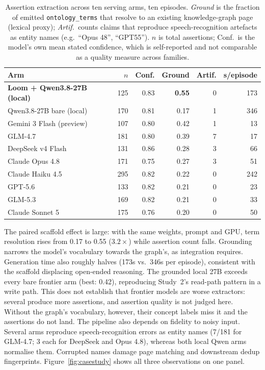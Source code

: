 \documentclass[10pt,twocolumn]{article}
\begin{document}
\begin{table}[t]\centering\small
\caption{Assertion extraction across ten serving arms, ten episodes. \emph{Ground}
is the fraction of emitted \texttt{ontology\_terms} that resolve to an existing knowledge-graph
page (lexical proxy); \emph{Artif.}\ counts claims that reproduce speech-recognition artefacts as
entity names (e.g.\ ``Opus 48'', ``GPT55''). $n$ is total assertions; Conf.\ is the model's own
mean stated confidence, which is self-reported and not comparable as a quality measure across
families.}
\label{tab:casestudy}
\renewcommand{\arraystretch}{1.15}
\begin{tabular}{@{}lrrrrr@{}}
\toprule
Arm & $n$ & Conf. & Ground & Artif. & s/episode \\
\midrule
\textbf{Loom + Qwen3.8-27B (local)} & 125 & 0.83 & \textbf{0.55} & 0 & 173 \\
Qwen3.8-27B bare (local)            & 170 & 0.81 & 0.17 & 1 & 346 \\
\midrule
Gemini 3 Flash (preview)            & 107 & 0.80 & 0.42 & 1 & 13 \\
GLM-4.7                             & 181 & 0.80 & 0.39 & 7 & 17 \\
DeepSeek v4 Flash                   & 131 & 0.86 & 0.28 & 3 & 66 \\
Claude Opus 4.8                     & 171 & 0.75 & 0.27 & 3 & 51 \\
Claude Haiku 4.5                    & 295 & 0.82 & 0.22 & 0 & 242 \\
GPT-5.6                             & 133 & 0.82 & 0.21 & 0 & 23 \\
GLM-5.3                             & 169 & 0.82 & 0.21 & 0 & 33 \\
Claude Sonnet 5                     & 175 & 0.76 & 0.20 & 0 & 50 \\
\bottomrule
\end{tabular}
\end{table}

The paired scaffold effect is large: with the same weights, prompt and GPU, term resolution
rises from 0.17 to 0.55 ($3.2\times$) while assertion count falls. Grounding narrows the model's
vocabulary towards the graph's, as integration requires. Generation time also roughly halves
(173s vs.\ 346s per episode), consistent with the scaffold displacing open-ended reasoning.
The grounded local 27B exceeds every bare frontier arm (best: 0.42), reproducing Study~2's
read-path pattern in a write path. This does not establish that frontier models are worse
extractors: several produce more assertions, and assertion quality is not judged here. Without
the graph's vocabulary, however, their concept labels miss it and the assertions do not land.
The pipeline also depends on fidelity to noisy input. Several arms reproduce speech-recognition
errors as entity names (7/181 for GLM-4.7; 3 each for DeepSeek and Opus 4.8), whereas both local
Qwen arms normalise them. Corrupted names damage page matching and downstream dedup
fingerprints. Figure~\ref{fig:casestudy} shows all three observations on one panel.
\end{document}
